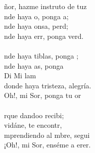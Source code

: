 \begin{cancion}%
	ñor, hazme instruto de tuz\\
	nde haya o, ponga a;\\
	nde haya onsa, perd;\\
	nde haya err, ponga verd.\\
	\jump\\
	nde haya tiblas, ponga ;\\
	nde haya as, ponga   \\
Di             Mi        lam\\
donde haya tristeza, alegría.\\
	Oh!, mi Sor, ponga tu or\\
	\jump\\
	rque dandoo recibi; \\
	vidáne, te encontr, \\
	mprendiendo al mbre, segui \\
	¡Oh!, mi Sor, enséme a erer. \\
\end{cancion}%
